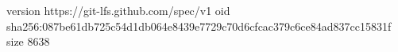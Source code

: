 version https://git-lfs.github.com/spec/v1
oid sha256:087be61db725c54d1db064e8439e7729c70d6cfcac379c6ce84ad837cc15831f
size 8638
